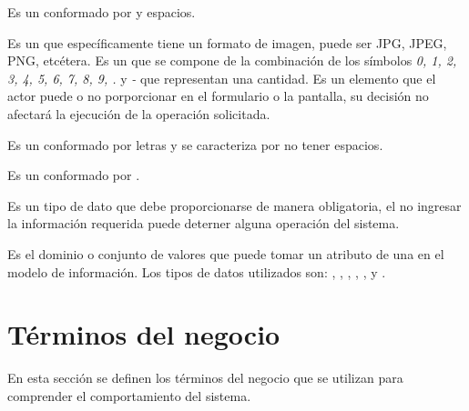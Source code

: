 \begin{description}
		 Es un   conformado por  y espacios.
		
		 Es un  que específicamente tiene
		        un formato de imagen, puede ser JPG, JPEG, PNG, etcétera.						
		 Es un  que se compone de la combinación de los símbolos \textit{0, 1, 2, 3, 4, 5, 6, 7, 8, 9, . } y \textit{-}  que representan una cantidad.		
		 Es un elemento que el actor puede o no porporcionar en el formulario o la pantalla, su decisión no afectará la ejecución de la operación solicitada.

		 Es un   conformado por letras y se caracteriza por no tener espacios.

		 Es un   conformado por .

		 Es un tipo de dato que debe proporcionarse de manera obligatoria, el no ingresar la información requerida puede deterner alguna operación del sistema.

		 Es el dominio o conjunto de valores que puede tomar un atributo de una  en el modelo de información. Los tipos de datos utilizados son: , , , , ,  y .

\end{description}


\section{Términos del negocio}
\label{gls:terminosNegocio}

	En esta sección se definen los términos del negocio que se utilizan para comprender el comportamiento del sistema.


